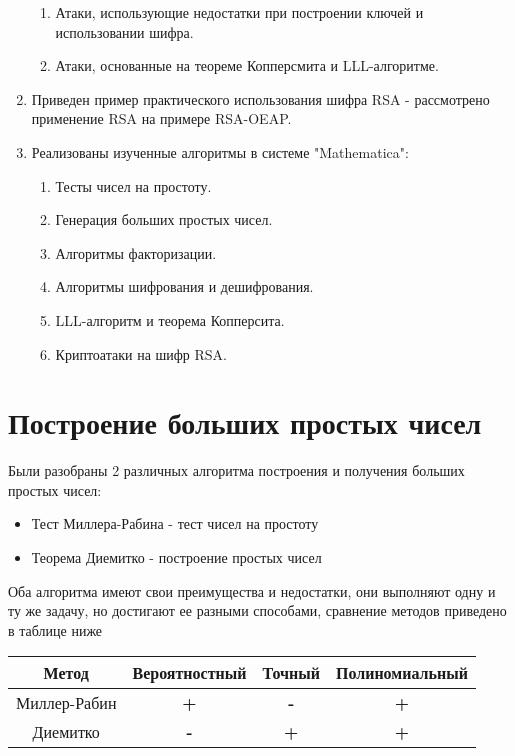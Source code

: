 \begin{enumerate}
      	\begin{enumerate}
      		\item Атаки, использующие недостатки при построении ключей и использовании шифра.
      		\item Атаки, основанные на теореме Копперсмита и LLL-алгоритме.    
      	\end{enumerate}
      \item Приведен пример практического использования шифра RSA - рассмотрено применение RSA на примере RSA-OEAP.      
      \item Реализованы изученные алгоритмы в системе "Mathematica":
      	\begin{enumerate}
          \item Тесты чисел на простоту.
          \item Генерация больших простых чисел.
          \item Алгоритмы факторизации.
          \item Алгоритмы шифрования и дешифрования.
          \item LLL-алгоритм и теорема Копперсита.
          \item Криптоатаки на шифр RSA.
        \end{enumerate}
\end{enumerate}

\section*{Построение больших простых чисел}
	Были разобраны 2 различных алгоритма построения и получения больших простых чисел:
		\begin{itemize}
			\item Тест Миллера-Рабина - тест чисел на простоту 
			\item Теорема Диемитко - построение простых чисел        
		\end{itemize}

	Оба алгоритма имеют свои преимущества и недостатки, они выполняют одну и ту же задачу, но достигают ее разными способами, сравнение методов 
	приведено в таблице ниже

	\begin{table}[h]
		\centering	
		\begin{tabular}{|c|c|c|c|}	
			\hline  		     
		    \textbf{Метод} & \textbf{Вероятностный} & \textbf{Точный} & \textbf{Полиномиальный} \\ \hline		    
		    Миллер-Рабин        & \textbf{+}           & \textbf{-}                & \textbf{+}             \\ \hline
		    Диемитко            & \textbf{-}           & \textbf{+}                & \textbf{+}             \\	\hline	  		    
		\end{tabular} 
	\end{table}

